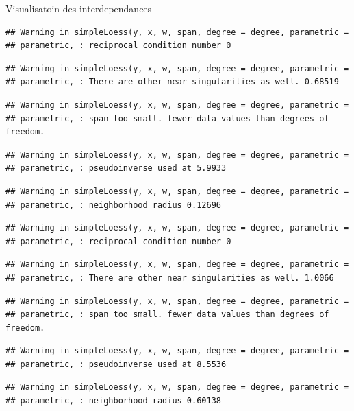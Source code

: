 \documentclass[11pt,ignorenonframetext,]{beamer}
\begin{document}
\begin{frame}[fragile]{Visualisatoin des interdependances}
\begin{verbatim}
## Warning in simpleLoess(y, x, w, span, degree = degree, parametric =
## parametric, : reciprocal condition number 0
\end{verbatim}

\begin{verbatim}
## Warning in simpleLoess(y, x, w, span, degree = degree, parametric =
## parametric, : There are other near singularities as well. 0.68519
\end{verbatim}

\begin{verbatim}
## Warning in simpleLoess(y, x, w, span, degree = degree, parametric =
## parametric, : span too small. fewer data values than degrees of freedom.
\end{verbatim}

\begin{verbatim}
## Warning in simpleLoess(y, x, w, span, degree = degree, parametric =
## parametric, : pseudoinverse used at 5.9933
\end{verbatim}

\begin{verbatim}
## Warning in simpleLoess(y, x, w, span, degree = degree, parametric =
## parametric, : neighborhood radius 0.12696
\end{verbatim}

\begin{verbatim}
## Warning in simpleLoess(y, x, w, span, degree = degree, parametric =
## parametric, : reciprocal condition number 0
\end{verbatim}

\begin{verbatim}
## Warning in simpleLoess(y, x, w, span, degree = degree, parametric =
## parametric, : There are other near singularities as well. 1.0066
\end{verbatim}

\begin{verbatim}
## Warning in simpleLoess(y, x, w, span, degree = degree, parametric =
## parametric, : span too small. fewer data values than degrees of freedom.
\end{verbatim}

\begin{verbatim}
## Warning in simpleLoess(y, x, w, span, degree = degree, parametric =
## parametric, : pseudoinverse used at 8.5536
\end{verbatim}

\begin{verbatim}
## Warning in simpleLoess(y, x, w, span, degree = degree, parametric =
## parametric, : neighborhood radius 0.60138
\end{verbatim}


\end{frame}
\end{document}
